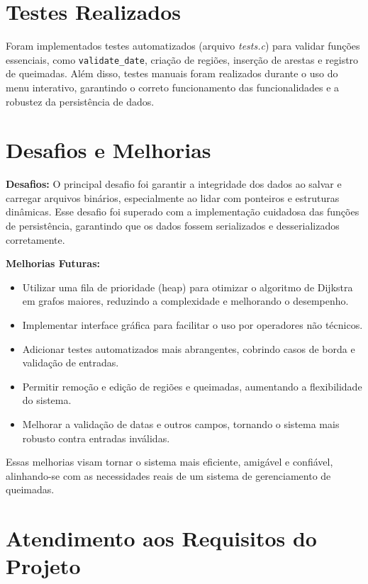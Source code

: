 \documentclass{article}
\begin{document}
\section{Testes Realizados}

Foram implementados testes automatizados (arquivo \textit{tests.c}) para validar funções essenciais, como \texttt{validate\_date}, criação de regiões, inserção de arestas e registro de queimadas. Além disso, testes manuais foram realizados durante o uso do menu interativo, garantindo o correto funcionamento das funcionalidades e a robustez da persistência de dados.

\section{Desafios e Melhorias}

\textbf{Desafios:} O principal desafio foi garantir a integridade dos dados ao salvar e carregar arquivos binários, especialmente ao lidar com ponteiros e estruturas dinâmicas. Esse desafio foi superado com a implementação cuidadosa das funções de persistência, garantindo que os dados fossem serializados e desserializados corretamente.

\textbf{Melhorias Futuras:}
\begin{itemize}
    \item Utilizar uma fila de prioridade (heap) para otimizar o algoritmo de Dijkstra em grafos maiores, reduzindo a complexidade e melhorando o desempenho.
    \item Implementar interface gráfica para facilitar o uso por operadores não técnicos.
    \item Adicionar testes automatizados mais abrangentes, cobrindo casos de borda e validação de entradas.
    \item Permitir remoção e edição de regiões e queimadas, aumentando a flexibilidade do sistema.
    \item Melhorar a validação de datas e outros campos, tornando o sistema mais robusto contra entradas inválidas.
\end{itemize}

Essas melhorias visam tornar o sistema mais eficiente, amigável e confiável, alinhando-se com as necessidades reais de um sistema de gerenciamento de queimadas.

\section{Atendimento aos Requisitos do Projeto}
\end{document}

